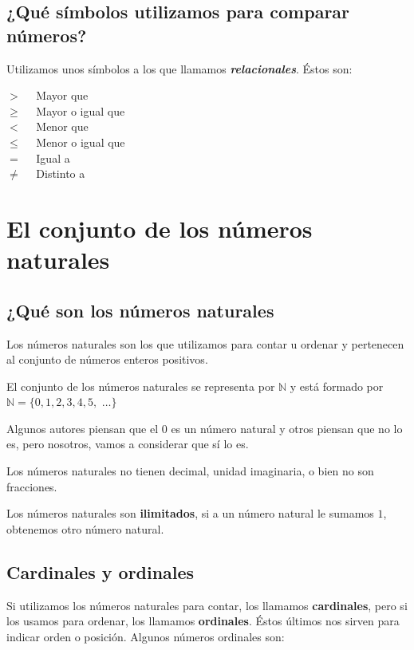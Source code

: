\subsection{¿Qué símbolos utilizamos para comparar números?}

Utilizamos unos símbolos a los que llamamos \textbf{\textit{relacionales}}. Éstos son:

\begin{multicols}{3}
    $> \quad$ Mayor que \\
    $\geq \quad$ Mayor o igual que \\
    $< \quad$ Menor que \\
    $\leq \quad$ Menor o igual que \\
    $= \quad$ Igual a \\
    $\neq \quad$ Distinto a
\end{multicols}

\section{El conjunto de los números naturales}

\subsection{¿Qué son los números naturales}

Los números naturales son los que utilizamos para contar u ordenar y pertenecen al conjunto de números enteros positivos.

El conjunto de los números naturales se representa por $\mathbb{N}$ y está formado por $\mathbb{N} = \{ 0, 1, 2, 3, 4, 5,$ $\hdots \}$

Algunos autores piensan que el $0$ es un número natural y otros piensan que no lo es, pero nosotros, vamos a considerar que sí lo es.

Los números naturales no tienen decimal, unidad imaginaria, o bien no son fracciones.

Los números naturales son \textbf{ilimitados}, si a un número natural le sumamos $1$, obtenemos otro número natural.

\subsection{Cardinales y ordinales}

Si utilizamos los números naturales para contar, los llamamos \textbf{cardinales}, pero si los usamos para ordenar, los llamamos \textbf{ordinales}. Éstos últimos nos sirven para indicar orden o posición. Algunos números ordinales son:

